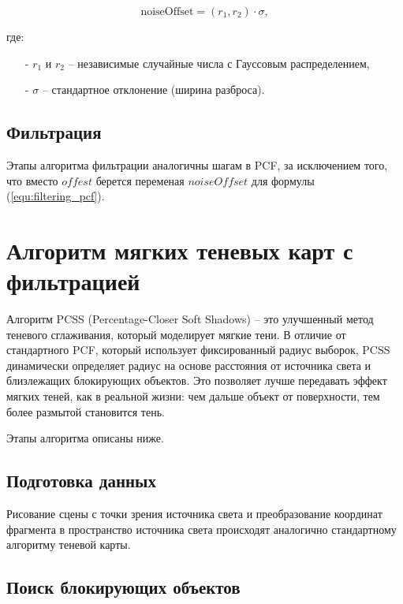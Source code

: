 \begin{equation}
    \label{equ:noise_offest}
    \text{noiseOffset} = (r_1, r_2) \cdot \sigma,
\end{equation}

\noindent где:

\begin{itemize}
    \item[-] $r_1$ и $r_2$ -- независимые случайные числа с Гауссовым распределением,
    \item[-] $\sigma$ -- стандартное отклонение (ширина разброса).
\end{itemize}

\subsection*{Фильтрация}

Этапы алгоритма фильтрации аналогичны шагам в PCF,
за исключением того, что вместо $offest$ берется
переменая $noiseOffset$ для формулы (\ref{equ:filtering_pcf}).

\section{Алгоритм мягких теневых карт с фильтрацией}

Алгоритм PCSS (Percentage-Closer Soft Shadows) --
это улучшенный метод теневого сглаживания,
который моделирует мягкие тени.
В отличие от стандартного PCF,
который использует фиксированный радиус выборок,
PCSS динамически определяет радиус на основе расстояния от источника света и
близлежащих блокирующих объектов.
Это позволяет лучше передавать эффект мягких теней,
как в реальной жизни: чем дальше объект от поверхности,
тем более размытой становится тень.

Этапы алгоритма описаны ниже.

\subsection*{Подготовка данных}

Рисование сцены с точки зрения источника света и
преобразование координат фрагмента в пространство источника света
происходят аналогично стандартному алгоритму теневой карты.

\subsection*{Поиск блокирующих объектов}

